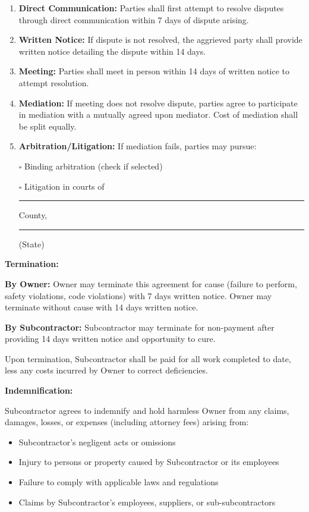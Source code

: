 \documentclass[11pt,letterpaper]{article}
\begin{document}
\begin{enumerate}
\item \textbf{Direct Communication:} Parties shall first attempt to resolve disputes through direct communication within 7 days of dispute arising.

\item \textbf{Written Notice:} If dispute is not resolved, the aggrieved party shall provide written notice detailing the dispute within 14 days.

\item \textbf{Meeting:} Parties shall meet in person within 14 days of written notice to attempt resolution.

\item \textbf{Mediation:} If meeting does not resolve dispute, parties agree to participate in mediation with a mutually agreed upon mediator. Cost of mediation shall be split equally.

\item \textbf{Arbitration/Litigation:} If mediation fails, parties may pursue:

   $\square$ Binding arbitration (check if selected)

   $\square$ Litigation in courts of \rule{4cm}{0.4pt} County, \rule{2cm}{0.4pt} (State)
\end{enumerate}

\vspace{6pt}

\textbf{Termination:}

\textbf{By Owner:} Owner may terminate this agreement for cause (failure to perform, safety violations, code violations) with 7 days written notice. Owner may terminate without cause with 14 days written notice.

\textbf{By Subcontractor:} Subcontractor may terminate for non-payment after providing 14 days written notice and opportunity to cure.

Upon termination, Subcontractor shall be paid for all work completed to date, less any costs incurred by Owner to correct deficiencies.

\vspace{6pt}

\textbf{Indemnification:}

Subcontractor agrees to indemnify and hold harmless Owner from any claims, damages, losses, or expenses (including attorney fees) arising from:
\begin{itemize}[leftmargin=0.5in]
\item Subcontractor's negligent acts or omissions
\item Injury to persons or property caused by Subcontractor or its employees
\item Failure to comply with applicable laws and regulations
\item Claims by Subcontractor's employees, suppliers, or sub-subcontractors
\end{itemize}
\end{document}

